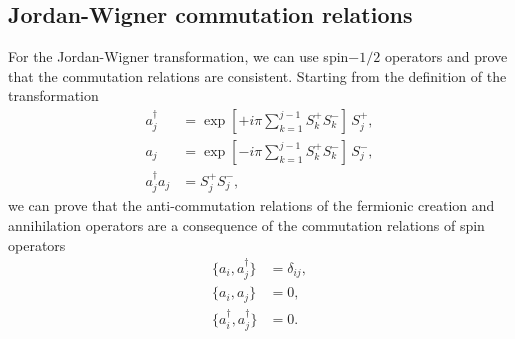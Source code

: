 \documentclass[a4paper]{report}
\begin{document}
\begin{spacing}{1.1}
\begin{appendices}
\section{Jordan-Wigner commutation relations}

For the Jordan-Wigner transformation, we can use spin$-1/2$ operators and prove that the commutation relations are consistent. Starting from the definition of the transformation
\begin{align}
    a^\dagger_j &= \exp[+i\pi \sum_{k=1}^{j-1} S_k^+S_k^-] \, S_j^+,\\
    a_j &= \exp[-i\pi \sum_{k=1}^{j-1} S_k^+S_k^-] \, S_j^-,\\
    a^\dagger_j a_j &= S_j^+ S_j^-,
\end{align}
we can prove that the anti-commutation relations of the fermionic creation and annihilation operators are a consequence of the commutation relations of spin operators
\begin{align}
    \{a_i,a^\dagger_j\} &= \delta_{ij},\\
    \{a_i,a_j\} &= 0,\\
    \{a^\dagger_i,a^\dagger_j\} &= 0.
\end{align}


\end{appendices}
\end{spacing}
\end{document}
